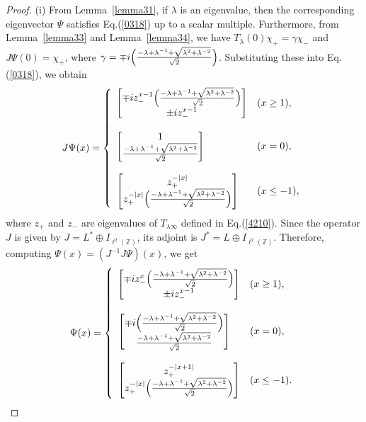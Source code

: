 \documentclass[a4paper,12pt]{article}
\theoremstyle{plain}
\theoremstyle{definition}
\theoremstyle{definition}
\begin{document}
\begin{proof}
($\mathrm{i}$) From Lemma~\ref{lemma31}, if $\lambda$ is an eigenvalue, then the corresponding eigenvector $\Psi$ satisfies Eq.(\ref{0318}) up to a scalar multiple. Furthermore, from Lemma~\ref{lemma33} and Lemma~\ref{lemma34}, we have $T_{\lambda}(0)\chi_+ = \gamma \chi_-$ and $J\Psi(0) = \chi_+$, where $\gamma =\mp i \Bigl( \frac{-\lambda +\lambda^{-1}+\sqrt{\lambda^2+\lambda^{-2}}}{\sqrt{2}} \Bigr)$. Substituting these into Eq.(\ref{0318}), we obtain
\begin{eqnarray}
J\Psi(x)=
\left\{\begin{array}{ll}
\begin{bmatrix}
\mp iz_{-}^{x-1}\Bigl(\frac{-\lambda +\lambda^{-1}+\sqrt{\lambda^2+\lambda^{-2}}}{\sqrt{2}} \Bigr) \\
\pm iz_{-}^{x-1}
\end{bmatrix} & (x\geq 1 ), \\\\
\begin{bmatrix}
    1 \\
    \frac{-\lambda +\lambda^{-1}+\sqrt{\lambda^2+\lambda^{-2}}}{\sqrt{2}}
\end{bmatrix} & (x=0), \\\\
\begin{bmatrix}
z_{+}^{-|x|} \\
z_{+}^{-|x|}\Bigl(\frac{-\lambda +\lambda^{-1}+\sqrt{\lambda^2+\lambda^{-2}}}{\sqrt{2}} \Bigr)
\end{bmatrix} & (x\leq -1),
\end{array}\right. \nonumber
\end{eqnarray}
where $z_+$ and $z_-$ are eigenvalues of $T_{\lambda \infty }$ defined in Eq.(\ref{4210}). Since the operator $J$ is given by $J=L^{*}\oplus I_{\ell^2(\mathbb{Z})}$, its adjoint is $J^*=L \oplus I_{\ell^2(\mathbb{Z})}$. Therefore, computing $\Psi(x)=(J^{-1}J\Psi)(x)$, we get
\begin{eqnarray}
\Psi(x)=
\left\{\begin{array}{ll}
\begin{bmatrix}
\mp i z_{-}^{x}\Bigl(\frac{-\lambda +\lambda^{-1}+\sqrt{\lambda^2+\lambda^{-2}}}{\sqrt{2}} \Bigr) \\
\pm i z_{-}^{x-1}
\end{bmatrix} & (x\geq 1 ), \\\\
\begin{bmatrix}
    \mp i\Bigl(\frac{-\lambda +\lambda^{-1}+\sqrt{\lambda^2+\lambda^{-2}}}{\sqrt{2}} \Bigr) \\
    \frac{-\lambda +\lambda^{-1}+\sqrt{\lambda^2+\lambda^{-2}}}{\sqrt{2}}
\end{bmatrix} & (x=0), \\\\
\begin{bmatrix}
z_{+}^{-|x+1|} \\
z_{+}^{-|x|}\Bigl(\frac{-\lambda +\lambda^{-1}+\sqrt{\lambda^2+\lambda^{-2}}}{\sqrt{2}} \Bigr)
\end{bmatrix} & (x\leq -1).
\end{array}\right. \nonumber
\end{eqnarray}


\end{proof}
\end{document}
